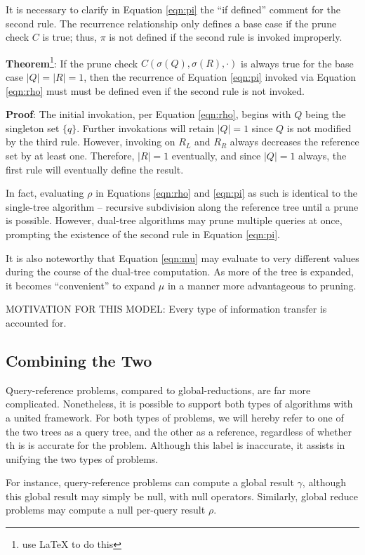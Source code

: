 \documentclass[times, 10pt,twocolumn]{article}
\begin{document}
It is necessary to clarify in Equation \ref{eqn:pi} the ``if defined'' comment for the second rule.
The recurrence relationship only defines a base case if the prune check $C$ is true; thus, $\pi$ is not defined if the second rule is invoked improperly.

{\bf Theorem}\footnote{use LaTeX to do this}: If the prune check $C(\sigma(Q), \sigma(R), \cdot)$ is always true for the base case $|Q| = |R| = 1$, then the recurrence of Equation \ref{eqn:pi} invoked via Equation \ref{eqn:rho} must must be defined even if the second rule is not invoked.

{\bf Proof}: The initial invokation, per Equation \ref{eqn:rho}, begins with $Q$ being the singleton set $\{q\}$.  Further invokations will retain $|Q| = 1$ since $Q$ is not modified by the third rule.  However, invoking on $R_L$ and $R_R$ always decreases the reference set by at least one.  Therefore, $|R| = 1$ eventually, and since $|Q| = 1$ always, the first rule will eventually define the result.

In fact, evaluating $\rho$ in Equations \ref{eqn:rho} and \ref{eqn:pi} as such is identical to the single-tree algorithm -- recursive subdivision along the reference tree until a prune is possible.
However, dual-tree algorithms may prune multiple queries at once, prompting the existence of the second rule in Equation \ref{eqn:pi}.

It is also noteworthy that Equation \ref{eqn:mu} may evaluate to very different values during the course of the dual-tree computation.
As more of the tree is expanded, it becomes ``convenient'' to expand $\mu$ in a manner more advantageous to pruning.

MOTIVATION FOR THIS MODEL: Every type of information transfer is accounted for.

\subsection{Combining the Two}

Query-reference problems, compared to global-reductions, are far more complicated.
Nonetheless, it is possible to support both types of algorithms with a united framework.
For both types of problems, we will hereby refer to one of the two trees as a query tree, and the other as a reference, regardless of whether th is is accurate for the problem.
Although this label is inaccurate, it assists in unifying the two types of problems.

For instance, query-reference problems can compute a global result $\gamma$, although this global result may simply be null, with null operators.
Similarly, global reduce problems may compute a null per-query result $\rho$.
\end{document}
